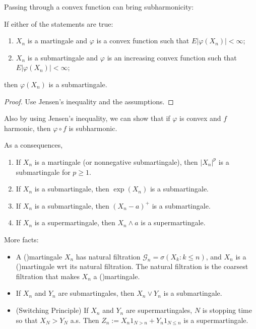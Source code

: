 Passing through a convex function can bring subharmonicity:
\begin{theorem}
	\label{thm:convexSubmartingale}
	If either of the statements are true:
	\begin{enumerate}
		\item $X_n$ is a martingale and $\varphi$ is a convex function such that $E|\varphi(X_n)| < \infty $;
		\item $X_n$ is a submartingale and $\varphi$ is an increasing convex function such that $E|\varphi(X_n)| < \infty $;
	\end{enumerate}
	then $\varphi(X_n)$ is a submartingale.
\end{theorem}
\begin{proof}
	Use Jensen's inequality and the assumptions.
\end{proof}
\begin{remark}
	Also by using Jensen's inequality, we can show that if $\varphi$ is convex and $f$ harmonic, then $\varphi \circ f$ is subharmonic.
\end{remark}
\begin{example}
	As a consequences, 
	\begin{enumerate}
		\item If $X_n$ is a martingale (or nonnegative submartingale), then $|X_n|^p$ is a submartingale for $p \ge 1$.
		\item If $X_n$ is a submartingale, then $\exp(X_n)$ is a submartingale.
		\item If $X_n$ is a submartingale, then $(X_n - a)^+$ is a submartingale.
		\item If $X_n$ is a supermartingale, then $X_n \wedge a$ is a supermartingale.
	\end{enumerate}
\end{example}

More facts:
\begin{itemize}
	\item A ()martingale $X_n$ has natural filtration $\mathcal{G}_n = \sigma(X_k: k\le n)$, and $X_n$ is a ()martingale wrt its natural filtration. The natural filtration is the coarsest filtration that makes $X_n$ a ()martingale.
	\item If $X_n$ and $Y_n$ are submartingales, then $X_n \vee Y_n$ is a submartingale.
	\item (Switching Principle) If $X_n$ and $Y_n$ are supermartingales, $N$ is stopping time so that $X_N > Y_N$ a.s. Then $Z_n := X_n 1_{N > n} + Y_n 1_{N \le  n}$ is a supermartingale.
\end{itemize}


